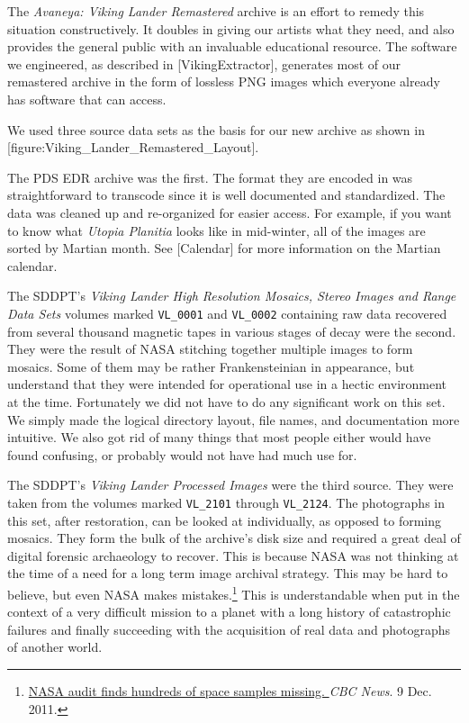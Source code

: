 The {\it Avaneya: Viking Lander Remastered} archive is an effort to remedy this situation constructively. It doubles in giving our artists what they need, and also provides the general public with an invaluable educational resource. The software we engineered, as described in [VikingExtractor], generates most of our remastered archive in the form of lossless PNG images which everyone already has software that can access.

We used three source data sets as the basis for our new archive as shown in [figure:Viking_Lander_Remastered_Layout].
\crlf

    {}

The PDS EDR archive was the first. The format they are encoded in was straightforward to transcode since it is well documented and standardized. The data was cleaned up and re-organized for easier access. For example, if you want to know what {\it Utopia Planitia} looks like in mid-winter, all of the images are sorted by Martian month. See [Calendar] for more information on the Martian calendar.

The SDDPT's {\it Viking Lander High Resolution Mosaics, Stereo Images and Range Data Sets} volumes marked {\tt VL_0001} and {\tt VL_0002} containing raw data recovered from several thousand magnetic tapes in various stages of decay were the second. They were the result of NASA stitching together multiple images to form mosaics. Some of them may be rather Frankensteinian in appearance, but understand that they were intended for operational use in a hectic environment at the time. Fortunately we did not have to do any significant work on this set. We simply made the logical directory layout, file names, and documentation more intuitive. We also got rid of many things that most people either would have found confusing, or probably would not have had much use for.

The SDDPT's {\it Viking Lander Processed Images} were the third source. They were taken from the volumes marked {\tt VL_2101} through {\tt VL_2124}. The photographs in this set, after restoration, can be looked at individually, as opposed to forming mosaics. They form the bulk of the archive's disk size and required a great deal of digital forensic archaeology to recover. This is because NASA was not thinking at the time of a need for a long term image archival strategy. This may be hard to believe, but even NASA makes mistakes.\footnote{\href{http://www.cbc.ca/news/technology/story/2011/12/09/science-missing-space-samples-nasa.html?cmp=rss}{NASA audit finds hundreds of space samples missing. }{\it CBC News}. 9 Dec. 2011.} This is understandable when put in the context of a very difficult mission to a planet with a long history of catastrophic failures and finally succeeding with the acquisition of real data and photographs of another world.

